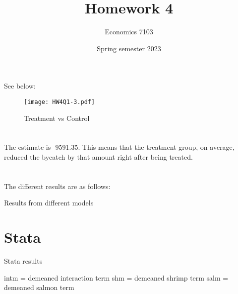 \documentclass{article}
\title{Homework 4}
\author{Economics 7103}
\date{Spring semester 2023}
\begin{document}
  
\maketitle
\section{}
See below:
\begin{figure}[ht]
    \centering
    \texttt{[image: HW4Q1-3.pdf]}
    \caption{Treatment vs Control}
    \label{fig:Fig1}
\end{figure}


\section{}
The estimate is -9591.35. This means that the treatment group, on average, reduced the bycatch by that amount right after being treated.
\newline
\newline

\section{}
The different results are as follows:
\begin{table}[ht]
    \centering
    
    \caption{Results from different models}
    \label{tab:my_label}
\end{table}
\newline
\newline
\newline
\newline
\newline
\newline
\newline
\newline
\newline
\newline
\newline
\newline
\newline
\newline
\newline
\newline

\section{Stata}
\begin{table}[ht]
    \centering
    
    \caption{Stata results}
    \label{tab:my_label}
    intm = demeaned interaction term
    shm = demeaned shrimp term
    salm = demeaned salmon term
\end{table}
\end{document}
